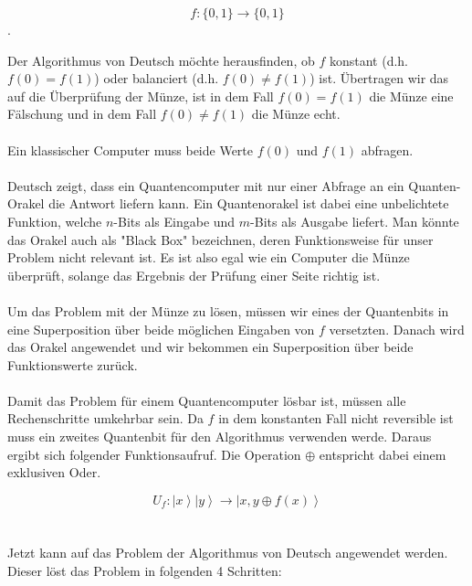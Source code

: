 $$f:\{0,1\} \rightarrow \{0,1\}$$. 

Der Algorithmus von Deutsch möchte herausfinden, ob $f$ konstant (d.h. $f(0)=f(1)$) oder balanciert (d.h. $f(0)\neq f(1)$) ist. Übertragen wir das auf die Überprüfung der Münze, ist in dem Fall $f(0) = f(1)$ die Münze eine Fälschung und in dem Fall $f(0) \neq f(1)$ die Münze echt. \\
\\
Ein klassischer Computer muss beide Werte $f(0)$ und $f(1)$ abfragen. \\
\\
Deutsch zeigt, dass ein Quantencomputer mit nur einer Abfrage an ein Quanten-Orakel die Antwort liefern kann. Ein Quantenorakel ist dabei eine unbelichtete Funktion, welche $n$-Bits als Eingabe und $m$-Bits als Ausgabe liefert. Man könnte das Orakel auch als "Black Box" bezeichnen, deren Funktionsweise für unser Problem nicht relevant ist. Es ist also egal wie ein Computer die Münze überprüft, solange das Ergebnis der Prüfung einer Seite richtig ist. \\
\\
Um das Problem mit der Münze zu lösen, müssen wir eines der Quantenbits in eine Superposition über beide möglichen Eingaben von $f$ versetzten. Danach wird das Orakel angewendet und wir bekommen ein Superposition über beide Funktionswerte zurück.\\
\\
Damit das Problem für einem Quantencomputer lösbar ist, müssen alle Rechenschritte umkehrbar sein. Da $f$ in dem konstanten Fall nicht reversible ist muss ein zweites Quantenbit für den Algorithmus verwenden werde. Daraus ergibt sich folgender Funktionsaufruf. Die Operation $\oplus$ entspricht dabei einem exklusiven Oder.

$$
U_f: \left|x\right\rangle\left| y\right\rangle \rightarrow  \left|x, y \oplus f(x)\right\rangle
$$\\
\\
Jetzt kann auf das Problem der Algorithmus von Deutsch angewendet werden. Dieser löst das Problem in folgenden 4 Schritten:

